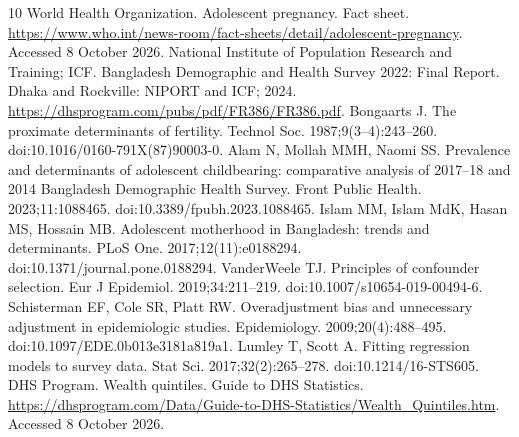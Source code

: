 \documentclass[11pt]{article}
\begin{document}
\begin{thebibliography}{10}
 World Health Organization. Adolescent pregnancy. Fact sheet. \url{https://www.who.int/news-room/fact-sheets/detail/adolescent-pregnancy}. Accessed 8 October 2026.
 National Institute of Population Research and Training; ICF. Bangladesh Demographic and Health Survey 2022: Final Report. Dhaka and Rockville: NIPORT and ICF; 2024. \url{https://dhsprogram.com/pubs/pdf/FR386/FR386.pdf}.
 Bongaarts J. The proximate determinants of fertility. Technol Soc. 1987;9(3--4):243--260. doi:10.1016/0160-791X(87)90003-0.
 Alam N, Mollah MMH, Naomi SS. Prevalence and determinants of adolescent childbearing: comparative analysis of 2017--18 and 2014 Bangladesh Demographic Health Survey. Front Public Health. 2023;11:1088465. doi:10.3389/fpubh.2023.1088465.
 Islam MM, Islam MdK, Hasan MS, Hossain MB. Adolescent motherhood in Bangladesh: trends and determinants. PLoS One. 2017;12(11):e0188294. doi:10.1371/journal.pone.0188294.
 VanderWeele TJ. Principles of confounder selection. Eur J Epidemiol. 2019;34:211--219. doi:10.1007/s10654-019-00494-6.
 Schisterman EF, Cole SR, Platt RW. Overadjustment bias and unnecessary adjustment in epidemiologic studies. Epidemiology. 2009;20(4):488--495. doi:10.1097/EDE.0b013e3181a819a1.
 Lumley T, Scott A. Fitting regression models to survey data. Stat Sci. 2017;32(2):265--278. doi:10.1214/16-STS605.
 DHS Program. Wealth quintiles. Guide to DHS Statistics. \url{https://dhsprogram.com/Data/Guide-to-DHS-Statistics/Wealth_Quintiles.htm}. Accessed 8 October 2026.
\end{thebibliography}

\clearpage\appendix
\end{document}
